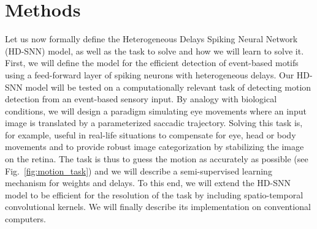 \documentclass[default]{sn-jnl}%
\theoremstyle{thmstyleone}%
\theoremstyle{thmstyletwo}%
\theoremstyle{thmstylethree}%
\newcommand{\seeFig}[1]{see Fig.~\ref{fig:#1}}%
\begin{document}
\section{Methods}
\label{sec:methods}
Let us now formally define the Heterogeneous Delays Spiking Neural Network (HD-SNN) model, as well as the task to solve and how we will learn to solve it. First, we will define the model for the efficient detection of event-based motifs using a feed-forward layer of spiking neurons with heterogeneous delays. Our HD-SNN model will be tested on a computationally relevant task of detecting motion detection from an event-based sensory input. By analogy with biological conditions, we will design a paradigm simulating eye movements where an input image is translated by a parameterized saccadic trajectory. Solving this task is, for example, useful in real-life situations to compensate for eye, head or body movements and to provide robust image categorization by stabilizing the image on the retina. The task is thus to guess the motion as accurately as possible (\seeFig{motion_task}) and we will describe a semi-supervised learning mechanism for weights and delays. To this end, we will extend the HD-SNN model to be efficient for the resolution of the task by including spatio-temporal convolutional kernels. We will finally describe its implementation on conventional computers. 
%
\end{document}
